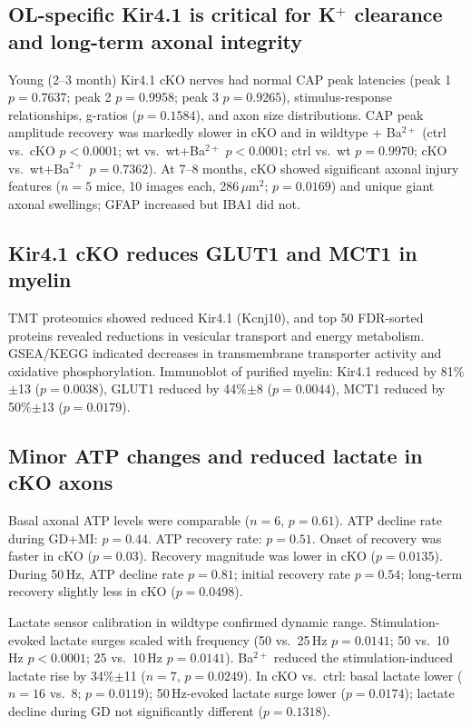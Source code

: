 \documentclass[11pt]{article}
\begin{document}
\subsection{OL-specific Kir4.1 is critical for K$^+$ clearance and long-term axonal integrity}
Young (2--3 month) Kir4.1 cKO nerves had normal CAP peak latencies (peak 1 $p=0.7637$; peak 2 $p=0.9958$; peak 3 $p=0.9265$), stimulus-response relationships, g-ratios ($p=0.1584$), and axon size distributions. CAP peak amplitude recovery was markedly slower in cKO and in wildtype + Ba$^{2+}$ (ctrl vs.\ cKO $p<0.0001$; wt vs.\ wt+Ba$^{2+}$ $p<0.0001$; ctrl vs.\ wt $p=0.9970$; cKO vs.\ wt+Ba$^{2+}$ $p=0.7362$). At 7--8 months, cKO showed significant axonal injury features ($n=5$ mice, 10 images each, 286\,$\mu$m$^2$; $p=0.0169$) and unique giant axonal swellings; GFAP increased but IBA1 did not.

\subsection{Kir4.1 cKO reduces GLUT1 and MCT1 in myelin}
TMT proteomics showed reduced Kir4.1 (Kcnj10), and top 50 FDR-sorted proteins revealed reductions in vesicular transport and energy metabolism. GSEA/KEGG indicated decreases in transmembrane transporter activity and oxidative phosphorylation. Immunoblot of purified myelin: Kir4.1 reduced by 81\%$\pm$13 ($p=0.0038$), GLUT1 reduced by 44\%$\pm$8 ($p=0.0044$), MCT1 reduced by 50\%$\pm$13 ($p=0.0179$).

\subsection{Minor ATP changes and reduced lactate in cKO axons}
Basal axonal ATP levels were comparable ($n=6$, $p=0.61$). ATP decline rate during GD+MI: $p=0.44$. ATP recovery rate: $p=0.51$. Onset of recovery was faster in cKO ($p=0.03$). Recovery magnitude was lower in cKO ($p=0.0135$). During 50\,Hz, ATP decline rate $p=0.81$; initial recovery rate $p=0.54$; long-term recovery slightly less in cKO ($p=0.0498$).

Lactate sensor calibration in wildtype confirmed dynamic range. Stimulation-evoked lactate surges scaled with frequency (50 vs.\ 25\,Hz $p=0.0141$; 50 vs.\ 10\,Hz $p<0.0001$; 25 vs.\ 10\,Hz $p=0.0141$). Ba$^{2+}$ reduced the stimulation-induced lactate rise by 34\%$\pm$11 ($n=7$, $p=0.0249$). In cKO vs.\ ctrl: basal lactate lower ($n=16$ vs.\ 8; $p=0.0119$); 50\,Hz-evoked lactate surge lower ($p=0.0174$); lactate decline during GD not significantly different ($p=0.1318$).
\end{document}
